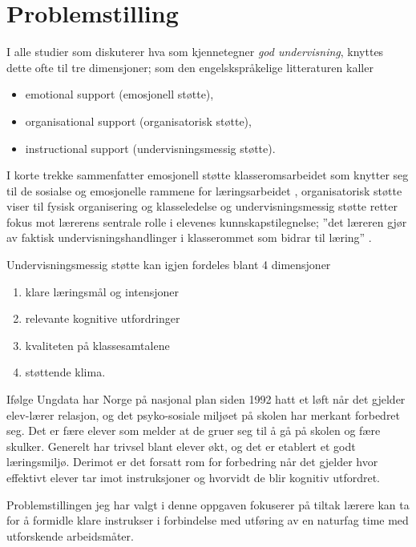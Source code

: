 \documentclass[main.tex]{subfiles}
\begin{document}
\section*{Problemstilling}    
I alle studier som diskuterer hva som kjennetegner \emph{god undervisning}, knyttes 
dette ofte til tre dimensjoner\cite[Klette 2013, side 142]{klette}; som den 
engelskspråkelige litteraturen kaller 
\begin{itemize}
\item emotional support (emosjonell støtte),
\item organisational support (organisatorisk støtte),
\item instructional support (undervisningsmessig støtte).
\end{itemize}
I korte trekke sammenfatter emosjonell støtte klasseromsarbeidet som knytter
seg til de sosialse og emosjonelle rammene for læringsarbeidet \cite[Klette 2013, side 143]{klette},
organisatorisk støtte viser til fysisk organisering og klasseledelse \cite[Klette 2013, side189]{klette}
og undervisningsmessig støtte retter fokus mot lærerens sentrale rolle i elevenes kunnskapstilegnelse; ''det 
læreren gjør av faktisk undervisningshandlinger i klasserommet som bidrar til læring'' 
\cite[Klette 2013, side 143 og 146]{klette}.
\newline

Undervisningsmessig støtte kan igjen fordeles blant 4 dimensjoner\cite[Klette 2013, side 146]{klette}
\begin{enumerate}
\item klare læringsmål og intensjoner
\item relevante kognitive utfordringer
\item kvaliteten på klassesamtalene
\item støttende klima.
\end{enumerate}

Ifølge Ungdata\cite[legg til referanse ungdata]{ungdata}\cite[Klette, side 144]{klette} har Norge på nasjonal 
plan siden 1992 hatt et løft når det gjelder elev-lærer 
relasjon, og det psyko-sosiale miljøet på skolen har merkant 
forbedret seg. Det er fære elever som melder at de gruer seg til å 
gå på skolen og fære skulker. Generelt har trivsel 
blant elever økt, og det er etablert et godt læringsmiljø. Derimot er det 
forsatt rom for forbedring når det gjelder hvor effektivt elever tar imot 
instruksjoner og hvorvidt de blir kognitiv utfordret. 
\newline

Problemstillingen jeg har valgt i denne oppgaven fokuserer  på tiltak 
lærere kan ta for å formidle klare instrukser i forbindelse med utføring av en 
naturfag time med utforskende arbeidsmåter\cite[legg til referanse 1 og 2]{utforsk}. 
\newline
\end{document}
